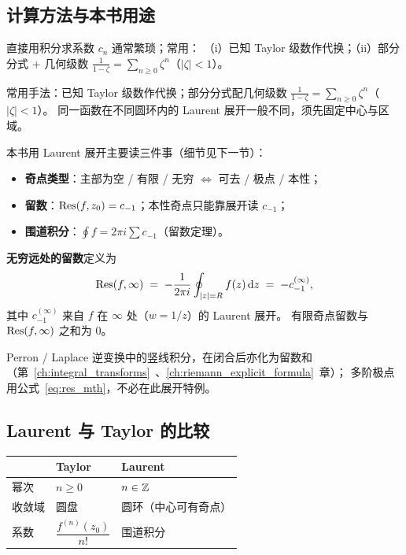\subsection{计算方法与本书用途}

直接用积分求系数 $c_n$ 通常繁琐；常用：
（i）已知 Taylor 级数作代换；（ii）部分分式 + 几何级数
$\frac{1}{1-\zeta}=\sum_{n\ge0}\zeta^n$（$|\zeta|<1$）。

常用手法：已知 Taylor 级数作代换；部分分式配几何级数
$\frac{1}{1-\zeta}=\sum_{n\ge0}\zeta^n$（$|\zeta|<1$）。
同一函数在不同圆环内的 Laurent 展开一般不同，须先固定中心与区域。

本书用 Laurent 展开主要读三件事（细节见下一节）：
\begin{itemize}
  \item \textbf{奇点类型}：主部为空 / 有限 / 无穷 $\Leftrightarrow$ 可去 / 极点 / 本性；
  \item \textbf{留数}：$\operatorname{Res}(f,z_0)=c_{-1}$；本性奇点只能靠展开读 $c_{-1}$；
  \item \textbf{围道积分}：$\oint f=2\pi i\sum c_{-1}$（留数定理）。
\end{itemize}

\label{def:res_infty}
\textbf{无穷远处的留数}定义为
\begin{equation}
  \operatorname{Res}(f,\infty)
  \;=\;
  -\frac{1}{2\pi i}\oint_{|z|=R}f(z)\,\mathrm{d}z
  \;=\;
  -c_{-1}^{(\infty)},
  \label{eq:res_infty}
\end{equation}
其中 $c_{-1}^{(\infty)}$ 来自 $f$ 在 $\infty$ 处（$w=1/z$）的 Laurent 展开。
有限奇点留数与 $\operatorname{Res}(f,\infty)$ 之和为 $0$。

Perron / Laplace 逆变换中的竖线积分，在闭合后亦化为留数和
（第~\ref{ch:integral_transforms}~、\ref{ch:riemann_explicit_formula}~章）；
多阶极点用公式~\eqref{eq:res_mth}，不必在此展开特例。

\subsection{Laurent 与 Taylor 的比较}

\begin{center}
\renewcommand{\arraystretch}{1.5}
\begin{tabular}{lll}
\toprule
 & Taylor & Laurent \\
\midrule
幂次 & $n\ge 0$ & $n\in\mathbb{Z}$ \\
收敛域 & 圆盘 & 圆环（中心可有奇点） \\
系数 & $\dfrac{f^{(n)}(z_0)}{n!}$ & 围道积分 \\
\bottomrule
\end{tabular}
\end{center}

